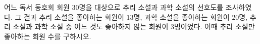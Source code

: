 어느 독서 동호회 회원 $30$명을 대상으로 추리 소설과 과학 소설의 선호도를 조사하였다. 그 결과 추리 소설을 좋아하는 회원이 $13$명, 과학 소설을 좋아하는 회원이 $20$명, 추리 소설과 과학 소설 중 어느 것도 좋아하지 않는 회원이 $3$명이었다. 이때 추리 소설만 좋아하는 회원 수를 구하시오.

